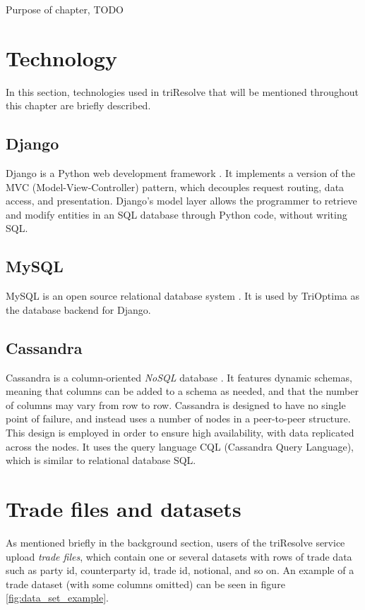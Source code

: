 Purpose of chapter, TODO

\section{Technology}
In this section, technologies used in triResolve that will be mentioned throughout this chapter are briefly described.

\subsection{Django}
Django is a Python web development framework \cite{holovaty_chapter_c1itd}. It implements a version of the MVC (Model-View-Controller) pattern, which decouples request routing, data access, and
presentation. Django's model layer allows the programmer to retrieve and modify entities in an SQL database through Python code, without writing SQL.

\subsection{MySQL}
MySQL is an open source relational database system \cite{what_wim}. It is used by TriOptima as the database backend for Django.

\subsection{Cassandra}
Cassandra is a column-oriented \textit{NoSQL} database \cite[p. 1-9]{mishra_2014_beginning_bacd}. It features dynamic schemas, meaning that columns can be added to a schema as needed, and that
the number of columns may vary from row to row. Cassandra is designed to have no single point of failure, and instead uses a number of nodes in a peer-to-peer structure. This design is
employed in order to ensure high availability, with data replicated across the nodes. It uses the query language CQL (Cassandra Query Language), which is similar to relational database SQL.

\section{Trade files and datasets}
As mentioned briefly in the background section, users of the triResolve service upload \textit{trade files}, which contain one or several datasets with
rows of trade data such as party id, counterparty id, trade id, notional, and so on. An example of a trade dataset (with some columns omitted) can be seen in figure
\ref{fig:data_set_example}.

